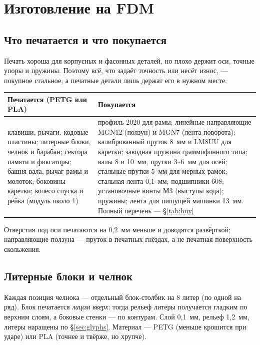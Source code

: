 \section{Изготовление на FDM}
\label{sec:fdm}

\subsection{Что печатается и что покупается}

Печать хороша для корпусных и фасонных деталей, но плохо держит оси, точные упоры и пружины. Поэтому всё, что задаёт точность или несёт износ, — покупное стальное, а печатные детали лишь держат его в нужном месте.

\begin{center}\small
\begin{tabularx}{\linewidth}{@{}>{\raggedright}p{52mm}>{\raggedright\arraybackslash}X@{}}
\toprule
Печатается (PETG или PLA) & Покупается \\
\midrule
клавиши, рычаги, кодовые пластины; литерные блоки, челнок и барабан; сектора памяти и фиксаторы; башня вала, рычаг рамы и молоток; боковины каретки; колесо спуска и рейка (модуль около 1) &
профиль 2020 для рамы; линейные направляющие MGN12 (ползун) и MGN7 (лента поворота); калиброванный пруток 8~мм и LM8UU для каретки; заводная пружина граммофонного типа; валы 8 и 10~мм, прутки 3--6~мм для осей; стальные прутки 5~мм для мерных рамок; стальная лента 0,1~мм; подшипники 608; установочные винты М3 (выступы кода); пружины; лента для пишущей машинки 13~мм. Полный перечень — \S\ref{tab:buy} \\
\bottomrule
\end{tabularx}
\end{center}

Отверстия под оси печатаются на 0,2~мм меньше и доводятся развёрткой; направляющие ползуна — пруток в печатных гнёздах, а не печатная поверхность скольжения.

\subsection{Литерные блоки и челнок}

Каждая позиция челнока — отдельный блок-столбик на 8 литер (по одной на ряд). Блок печатается \emph{лицом вверх}: тогда рельеф литеры получается гладким по верхним слоям, а боковые стенки — по контурам. Слой 0,1~мм, рельеф 1,2~мм, литеры наращены по \S\ref{sec:glyphs}. Материал — PETG (меньше крошится при ударе) или PLA (точнее и твёрже, но хрупче).

